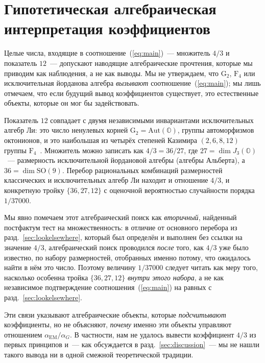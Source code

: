 \documentclass[aps,prd,twocolumn,amsmath,amssymb,floatfix,nofootinbib]{revtex4-2}
\begin{document}
\section{Гипотетическая алгебраическая интерпретация коэффициентов}
\label{sec:algebra}

Целые числа, входящие в соотношение~(\ref{eq:main})~--- множитель $4/3$ и
показатель $12$~--- допускают наводящие алгебраические прочтения, которые мы
приводим как наблюдения, а не как выводы. Мы не утверждаем, что
$\mathrm{G}_2$, $\mathrm{F}_4$ или исключительная йорданова алгебра
\emph{вызывают} соотношение~(\ref{eq:main}); мы лишь отмечаем, что если
будущий вывод коэффициентов существует, это естественные объекты, которые
он мог бы задействовать.

Показатель $12$ совпадает с двумя независимыми инвариантами исключительных
алгебр Ли: это число ненулевых корней
$\mathrm{G}_2 = \mathrm{Aut}(\mathbb{O})$, группы автоморфизмов октонионов,
и это наибольшая из четырёх степеней Казимира $(2,6,8,12)$ группы
$\mathrm{F}_4$~\cite{bincer1993}. Множитель можно записать как
$4/3 = 36/27$, где $27 = \dim J_3(\mathbb{O})$~--- размерность
исключительной йордановой алгебры (алгебры Альберта), а
$36 = \dim \mathrm{SO}(9)$. Перебор рациональных комбинаций размерностей
классических и исключительных алгебр Ли находит и отношение $4/3$, и
конкретную тройку $\{36,27,12\}$ с оценочной вероятностью случайности
порядка $1/37000$.

Мы явно помечаем этот алгебраический поиск как \emph{вторичный}, найденный
постфактум тест на множественность: в отличие от основного перебора из
разд.~\ref{sec:lookelsewhere}, который был определён и выполнен без ссылки
на значение $4/3$, алгебраический поиск проводился \emph{после} того, как
$4/3$ уже было известно, по набору размерностей, отобранных именно потому,
что ожидалось найти в нём это число. Поэтому величину $1/37000$ следует
читать как меру того, насколько особенна тройка $\{36,27,12\}$
\emph{внутри этого набора}, а не как независимое подтверждение
соотношения~(\ref{eq:main}) на равных с разд.~\ref{sec:lookelsewhere}.

Эти связи указывают алгебраические объекты, которые \emph{подсчитывают}
коэффициенты, но не объясняют, \emph{почему} именно эти объекты управляют
отношением $\alpha_{\mathrm{EM}}/\alpha_G$. В частности, нам не удалось
вывести коэффициент $4/3$ из первых принципов и~--- как обсуждается в
разд.~\ref{sec:discussion}~--- мы не нашли такого вывода ни в одной смежной
теоретической традиции.
\end{document}
